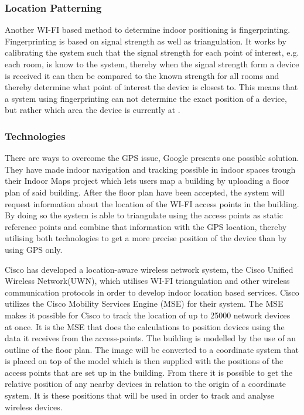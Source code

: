 \subsubsection*{Location Patterning}
Another WI-FI based method to determine indoor positioning is fingerprinting. Fingerprinting is based on signal strength as well as triangulation. It works by calibrating the system such that the signal strength for each point of interest, e.g. each room, is know to the system, thereby when the signal strength form a device is received it can then be compared to the known strength for all rooms and thereby determine what point of interest the device is closest to. This means that a system using fingerprinting can not determine the exact position of a device, but rather which area the device is currently at \cite{fingerprint1}.

\subsubsection{Technologies}
There are ways to overcome the GPS issue, Google presents one possible solution. They have made indoor navigation and tracking possible in indoor spaces trough their Indoor Maps project \cite{IPSoverGPS} which lets users map a building by uploading a floor plan of said building. After the floor plan have been accepted, the system will request information about the location of the WI-FI access points in the building. By doing so the system is able to triangulate using the access points as static reference points and combine that information with the GPS location, thereby utilising both technologies to get a more precise position of the device than by using GPS only.

Cisco has developed a location-aware wireless network system, the Cisco Unified Wireless Network(UWN), which utilises WI-FI triangulation\cite{CiscoTri} and other wireless communication protocols in order to develop indoor location based services\cite{uwn}.
Cisco utilizes the Cisco Mobility Services Engine (MSE) for their system. The MSE makes it possible for Cisco to track the location of up to 25000 network devices at once. It is the MSE that does the calculations to position devices using the data it receives from the access-points\cite{ciscoMSE}.
The building is modelled by the use of an outline of the floor plan. The image will be converted to a coordinate system that is placed on top of the model which is then supplied with the positions of the access points that are set up in the building. From there it is possible to get the relative position of any nearby devices in relation to the origin of a coordinate system. It is these positions that will be used in order to track and analyse wireless devices.

